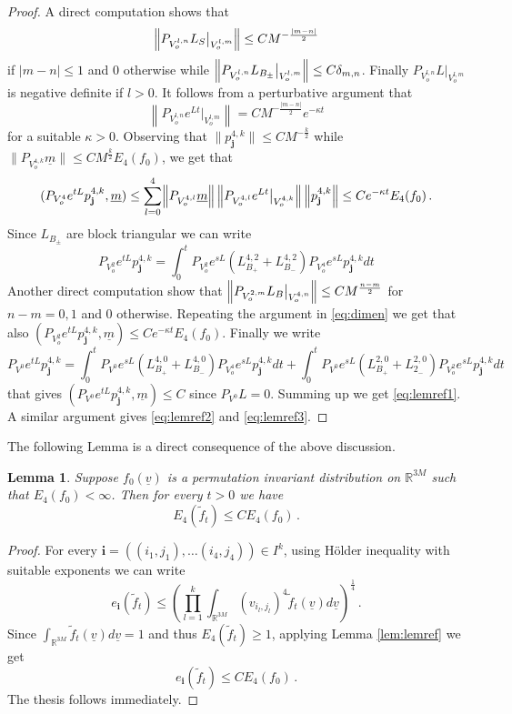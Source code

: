 \documentclass{article}
\def\red{}
\newcommand*\R{ \mathds{R} }
\newcommand\uv{{\underline v}}
\newtheorem{mylemma}[mythm]{Lemma}
\begin{document}
\begin{proof} A direct computation shows that
\[
\Bigl\|P_{V^{l,n}_o}L_S\bigr|_{V^{l,m}_o}\Bigr\|\leq C M^{-\frac{|m-n|}2}
\]
if $|m-n|\leq 1$ and 0 otherwise while $\Bigl\|P_{V^{l,n}_o}L_{B_{\pm}}\bigr|_{V^{l,m}_o}\Bigr\|\leq C \delta_{m,n}$. 
Finally 
$P_{V^{l,n}_o}L\bigr|_{V^{l,m}_o}$ is negative definite if $l>0$.  It follows
from a perturbative argument that
\[
\left\|P_{V^{l,n}_o}e^{L t}\bigr|_{V^{l,m}_o}\right\|=CM^{-\frac{|m-n|}2}e^{-\kappa t}
\]
for a suitable $\kappa>0$. Observing that $\|p_{\mathbf j}^{4,k}\|\leq C M^{-\frac k2}$ while $\|P_{V^{4,k}_o}
\underline m\|\leq C M^{\frac k2}E_4(f_0)$, we get that
\begin{equation}\label{eq:dimen}
(P_{V^4_o}e^{t L}p_{\mathbf j}^{4,k},\underline m)\leq \sum_{l=0}^4 \Bigl\|P_{V^{4,l}_o}\underline
m\Bigr\|\left\|P_{V^{4,l}_o}e^{L t}\bigr|_{V^{4,k}_o}\right\|\left\|p_{\mathbf j}^{4,k}\right\|\leq Ce^{-\kappa 
t}E_4(f_0)\, .
\end{equation}
Since $L_{B_\pm}$ are block triangular we can write
\[
P_{V^2_o}e^{t L}p_{\mathbf j}^{4,k}=\int_0^t P_{V^2_o}e^{s L}(L_{B_+}^{4,2}+L_{B_-}^{4,2})P_{V^4_o}e^{s L}p_{\mathbf 
j}^{4,k}dt
\] 
Another direct computation show that $\Bigl\|P_{V^{2,m}_o}L_B\bigr|_{V^{4,n}_o}\Bigr\|\leq C M^{\frac{n-m}2}$ for 
$n-m=0,1$ and 0 otherwise. Repeating the argument in \eqref{eq:dimen} we get that also $(P_{V^2_o}e^{t 
L}p_{\mathbf j}^{4,k},\underline m)\leq Ce^{-\kappa t}E_4(f_0)$. Finally we write
\[
P_{V^0}e^{t L}p_{\mathbf j}^{4,k}=\int_0^t P_{V^0}e^{s L}(L_{B_+}^{4,0}+L_{B_-}^{4,0})P_{V^4_o}e^{s L}p_{\mathbf 
j}^{4,k}dt+
\int_0^t P_{V^0}e^{s L}(L_{B_+}^{2,0}+L_{2_-}^{2,0})P_{V^2_o}e^{s L}p_{\mathbf j}^{4,k}dt
\]
that gives $(P_{V^0}e^{t L}p_{\mathbf j}^{4,k},\underline m)\leq C$ since $P_{V^0}L=0$. Summing up we get \eqref{eq:lemref1}. A similar argument gives \eqref{eq:lemref2} and \eqref{eq:lemref3}.

\end{proof}

The following Lemma is a direct consequence of the above discussion.

\begin{mylemma} \label{Lemma:MomentBounds} 
Suppose $f_0(\uv)$ is a permutation invariant distribution on $\R^{3M}$ such that 
$E_4(f_0)< \infty$. Then for every $t>0$ we have 
\[	
E_4(\tilde f_t) \leq C E_4(f_0)\, .
\]
\end{mylemma}

\begin{proof}
For every $\mathbf i=((i_1,j_1),\ldots(i_4,j_4))\in I^k$, \red{using H\"older inequality with suitable exponents} we 
can write
\[
e_{\mathbf i}(\tilde f_t)\leq \left(\prod_{l=1}^k\int_{\R^{3M}}(v_{i_l,j_l})^4 \tilde f_t(\uv)d\uv\right)^{\frac 14}\, .
\]
Since  $\int_{\R^{3M}}\tilde f_t(\uv)d\uv=1$ and thus $E_4(\tilde f_t)\geq 1$, applying Lemma \ref{lem:lemref} we get
\[
e_{\mathbf i}(\tilde f_t)\leq 
CE_4(f_0)\,.
\]
The thesis follows immediately.
\end{proof}
\end{document}
